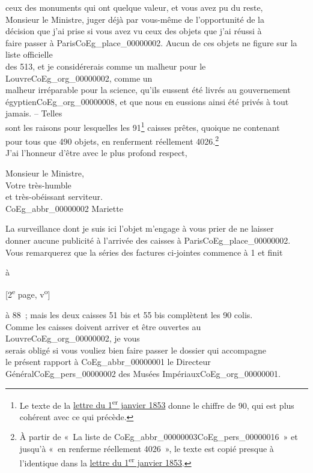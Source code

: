 \documentclass{book}
\begin{document}
ceux des monuments qui ont quelque valeur, et vous avez pu du reste,\\
Monsieur le Ministre, juger déjà par vous-même de l’opportunité de la\\
décision que j’ai prise si vous avez vu ceux des objets que j’ai réussi à\\
faire passer à Paris\gls{CoEg_place_00000002}. Aucun de ces objets ne figure sur la liste officielle\\
des 513, et je considérerais comme un malheur pour le Louvre\gls{CoEg_org_00000002}, comme un\\
malheur irréparable pour la science, qu’ils eussent été livrés au gouvernement\\
égyptien\gls{CoEg_org_00000008}, et que nous en eussions ainsi été privés à tout jamais. – Telles\\
sont les raisons pour lesquelles les 91\footnote{Le texte de la \hyperlink{CoEg_Mariette_1853-01-01}{lettre du 1\textsuperscript{er} janvier 1853} donne le chiffre de 90, qui est plus cohérent avec ce qui précède.} caisses prêtes, quoique ne contenant\\
pour tous que 490 objets, en renferment réellement 4026.\footnote{À partir de «~La liste de \gls{CoEg_abbr_00000003}\gls{CoEg_pers_00000016}~» et jusqu'à «~en renferme réellement 4026~», le texte est copié presque à l'identique dans la \hyperlink{CoEg_Mariette_1853-01-01}{lettre du 1\textsuperscript{er} janvier 1853}.}\\
\indent J’ai l’honneur d’être avec le plus profond respect,\\
\begin{center}Monsieur le Ministre,\\
\hspace{5cm} Votre très-humble\\
\hspace{5cm} et très-obéissant serviteur.\\
\hspace{5cm} \gls{CoEg_abbr_00000002} Mariette\end{center}
\indent La surveillance dont je suis ici l’objet m’engage à vous prier de ne laisser\\
donner aucune publicité à l’arrivée des caisses à Paris\gls{CoEg_place_00000002}.\\
\indent Vous remarquerez que la séries des factures ci-jointes commence à 1 et finit
\begin{flushright}à\end{flushright}
{\footnotesize\begin{center} {[2\textsuperscript{e} page, v\textsuperscript{o}]}\end{center}}
\noindent à 88~; mais les deux caisses 51 bis et 55 bis complètent les 90 colis.\\
\indent Comme les caisses doivent arriver et être ouvertes au Louvre\gls{CoEg_org_00000002}, je vous\\
serais obligé si vous vouliez bien faire passer le dossier qui accompagne\\
le présent rapport à \gls{CoEg_abbr_00000001} le Directeur Général\gls{CoEg_pers_00000002} des Musées Impériaux\gls{CoEg_org_00000001}.
\end{document}

